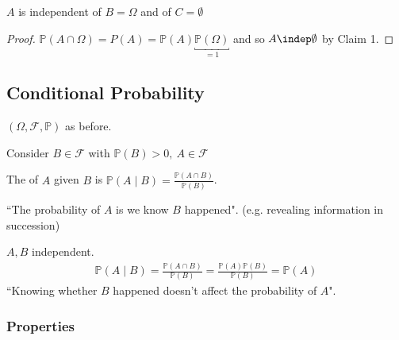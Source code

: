 \begin{claim}
    $A$ is independent of $B = \Omega$ and of $C = \emptyset$
\end{claim} 

\begin{proof}
    $\mathbb{P}(A \cap \Omega) = P(A) = \mathbb{P}(A) \underbracket{\mathbb{P}(\Omega)}_{= 1}$ and so $A \indep \emptyset$ by Claim 1.
\end{proof} 

\subsection{Conditional Probability}
$(\Omega, \mathcal{F}, \mathbb{P})$ as before.

Consider $B \in \mathcal{F}$ with $\mathbb{P}(B) > 0,\ A \in \mathcal{F}$

\begin{definition} \label{def:condition}
    The  of $A$ given $B$ is $\mathbb{P}(A \mid B) = \frac{\mathbb{P}(A \cap B)}{\mathbb{P}(B)}$.
\end{definition} 
\color{blue} ``The probability of $A$ is we know $B$ happened". (e.g. revealing information in succession)

\begin{example}
    $A, B$ independent.
    \begin{align*}
        \mathbb{P}(A \mid B) = \frac{\mathbb{P}(A \cap B)}{\mathbb{P}(B)} = \frac{\mathbb{P}(A) \mathbb{P}(B)}{\mathbb{P}(B)} = \mathbb{P}(A)
    \end{align*} 
    \color{blue}``Knowing whether $B$ happened doesn't affect the probability of $A$".
\end{example} 
\color{black}

\subsubsection{Properties}


